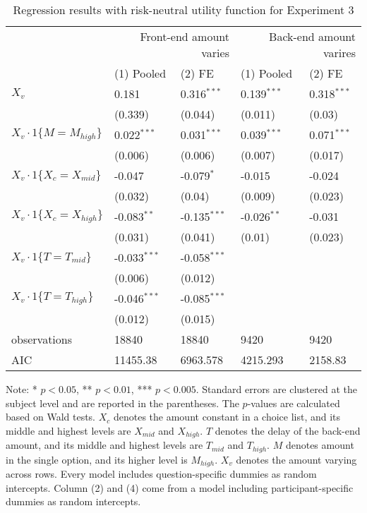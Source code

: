 \documentclass[12pt]{article}
\begin{document}
\begin{table}
    \caption{Regression results with risk-neutral utility function for Experiment 3}
    \vspace*{12pt}
    \centering

      \begin{tabular}{lllll}
\hline
 & \multicolumn{2}{r}{Front-end amount varies} & \multicolumn{2}{r}{Back-end amount varires} \\
 & (1) Pooled & (2) FE & (1) Pooled & (2) FE \\
\hline
$X_v$ & 0.181 & 0.316$^{***}$ & 0.139$^{***}$ & 0.318$^{***}$ \\
 & (0.339) & (0.044) & (0.011) & (0.03) \\
$X_v\cdot1\{M=M_{high}\}$ & 0.022$^{***}$ & 0.031$^{***}$ & 0.039$^{***}$ & 0.071$^{***}$ \\
 & (0.006) & (0.006) & (0.007) & (0.017) \\
$X_v\cdot1\{X_c=X_{mid}\}$ & -0.047 & -0.079$^{*}$ & -0.015 & -0.024 \\
 & (0.032) & (0.04) & (0.009) & (0.023) \\
$X_v\cdot1\{X_c=X_{high}\}$ & -0.083$^{**}$ & -0.135$^{***}$ & -0.026$^{**}$ & -0.031 \\
 & (0.031) & (0.041) & (0.01) & (0.023) \\
$X_v\cdot1\{T=T_{mid}\}$ & -0.033$^{***}$ & -0.058$^{***}$ &  &  \\
 & (0.006) & (0.012) &  &  \\
$X_v\cdot1\{T=T_{high}\}$ & -0.046$^{***}$ & -0.085$^{***}$ &  &  \\
 & (0.012) & (0.015) &  &  \\\hline

observations & 18840 & 18840 & 9420 & 9420 \\
AIC & 11455.38 & 6963.578 & 4215.293 & 2158.83 \\
\hline
\end{tabular}

    \vspace*{4pt}
    \centering
    \begin{minipage}{0.85\textwidth}
    {\par\footnotesize Note: * $p<0.05$, ** $p<0.01$, *** $p<0.005$. Standard errors are clustered at the subject level and are reported in the parentheses. The $p$-values are calculated based on Wald tests. $X_c$ denotes the amount constant in a choice list, and its middle and highest levels are $X_{mid}$ and $X_{high}$. $T$ denotes the delay of the back-end amount, and its middle and highest levels are $T_{mid}$ and $T_{high}$. $M$ denotes amount in the single option, and its higher level is $M_{high}$. $X_v$ denotes the amount varying across rows. Every model includes question-specific dummies as random intercepts. Column (2) and (4) come from a model including participant-specific dummies as random intercepts.}
    \end{minipage}
    \label{tab:exp1_reg_baseline}
\end{table}
\end{document}
